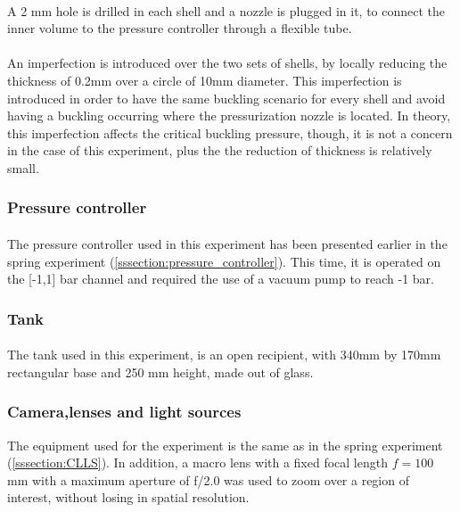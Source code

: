 \paragraph{}
A 2 mm hole is drilled in each shell and a nozzle is plugged in it, to connect the inner volume to the pressure controller through a flexible tube.
\paragraph{}
An imperfection is introduced over the two sets of shells, by locally reducing the thickness of 0.2mm over a circle of 10mm diameter. This imperfection is introduced in order to have the same buckling scenario for every shell and avoid having a buckling occurring where the pressurization nozzle is located.
In theory, this imperfection affects the critical buckling pressure\cite{Preis}, though, it is not a concern in the case of this experiment, plus the the reduction of thickness is relatively small.
\subsubsection{Pressure controller}
\paragraph{}
The pressure controller used in this experiment has been presented earlier in the spring experiment (\ref{sssection:pressure_controller}). This time, it is operated on the [-1,1] bar channel and required the use of a vacuum pump to reach -1 bar.
\subsubsection{Tank}
\paragraph{}
The tank used in this experiment, is an open recipient, with 340mm by 170mm rectangular base and 250 mm height, made out of glass.  
\subsubsection{Camera,lenses and light sources}
The equipment used for the experiment is the same as in the spring experiment (\ref{sssection:CLLS}). In addition, a macro lens with a fixed focal length $f= 100$ mm with a maximum aperture of f/2.0 was used to zoom over a region of interest, without losing in spatial resolution.
  
